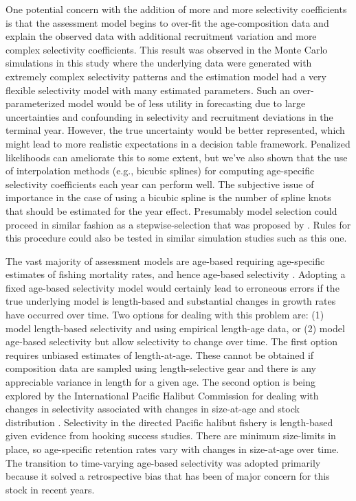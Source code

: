 One potential concern with the addition of more and more selectivity coefficients is that the assessment model begins to over-fit the age-composition data and explain the observed data with additional recruitment variation and more complex selectivity coefficients.  This result was observed in the Monte Carlo simulations in this study where the underlying data were generated with extremely complex selectivity patterns and the estimation model had a very flexible selectivity model with many estimated parameters.  Such an over-parameterized model would be of less utility in forecasting due to large uncertainties and confounding in selectivity and recruitment deviations in the terminal year. However, the true uncertainty would be better represented, which might lead to more realistic expectations in a decision table framework.  Penalized likelihoods can ameliorate this to some extent, but we've also shown that the use of interpolation methods (e.g., bicubic splines) for computing age-specific selectivity coefficients each year can perform well.  The subjective issue of importance in the case of using a bicubic spline is the number of spline knots that should be estimated for the year effect.  Presumably model selection could proceed in similar fashion as a stepwise-selection that was proposed by  \cite{thorson2012stepwise}.  Rules for this procedure could also be tested in similar simulation studies such as this one.

 The vast majority of assessment models are age-based requiring age-specific estimates of fishing mortality rates, and hence age-based selectivity \citep{gavaris2002sif}.  Adopting a fixed age-based selectivity model would certainly lead to erroneous errors if the true underlying model is length-based and substantial changes in growth rates have occurred over time.  Two options for dealing with this problem are: (1) model length-based selectivity and using empirical length-age data, or (2) model age-based selectivity but allow selectivity to change over time. The first option requires unbiased estimates of length-at-age.  These cannot be obtained if composition data are sampled using length-selective gear and there is any appreciable variance in length for a given age. The second option is being explored by the International Pacific Halibut Commission for dealing with changes in selectivity associated with changes in size-at-age and stock distribution \citep{stewart2012assessment}.  Selectivity in the directed Pacific halibut fishery is length-based given evidence from hooking success studies. There are minimum size-limits in place, so age-specific retention rates vary with changes in size-at-age over time.  The transition to time-varying age-based selectivity was adopted primarily because it solved a retrospective bias that has been of major concern for this stock in recent years.

